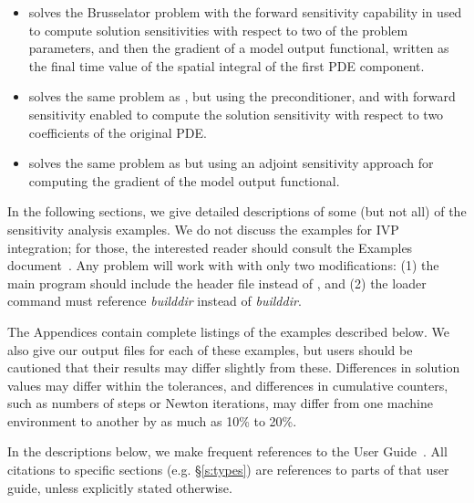 \begin{itemize}
\item {}
  solves the Brusselator problem with the forward sensitivity capability in {\idas}
  used to compute solution sensitivities with respect to two of the problem 
  parameters, and then the gradient of a model output functional, written as
  the final time value of the spatial integral of the first PDE component.

\item {}
  solves the same problem as , but using the {\idabbdpre}
  preconditioner, and with forward sensitivity enabled to compute the solution
  sensitivity with respect to two coefficients of the original PDE.
  

\item {}
  solves the same problem as  but using an adjoint
  sensitivity approach for computing the gradient of the model output functional.

\end{itemize}


\vspace{0.2in}\noindent
In the following sections, we give detailed descriptions of some (but
not all) of the sensitivity analysis examples. We do not discuss the 
examples for IVP integration; for those, the interested reader should consult
the {\ida} Examples document~\cite{ida_ex}. Any {\ida} problem
will work with {\idas} with only two modifications: (1) the main program
should include the header file  instead of , and
(2) the loader command must reference
{\em builddir} instead of
{\em builddir}.

The Appendices contain complete listings
of the examples described below.  We also give our output files for
each of these examples, but users should be cautioned that their
results may differ slightly from these.  Differences in solution
values may differ within the tolerances, and differences in cumulative
counters, such as numbers of steps or Newton iterations, may differ
from one machine environment to another by as much as 10\% to 20\%.

In the descriptions below, we make frequent references to the {\idas}
User Guide~\cite{idas_ug}.  All citations to specific sections
(e.g. \S\ref{s:types}) are references to parts of that user guide, unless
explicitly stated otherwise.

